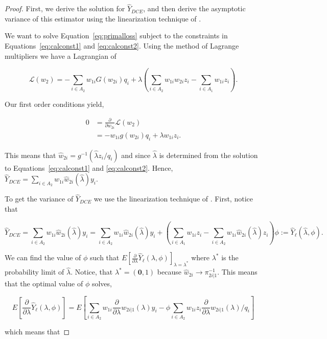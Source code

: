 \documentclass[12pt]{article}
\renewcommand{\bf}[1]{\mathbf{#1}}
\begin{document}
\begin{proof}
  First, we derive the solution for $\hat Y_{DCE}$, and then derive the
  asymptotic variance of this estimator using the linearization technique of
  \cite{randles1982asymptotic}.

  We want to solve Equation~\ref{eq:primalloss} subject to the constraints in
  Equations~\ref{eq:calconst1} and \ref{eq:calconst2}. Using the method of
  Lagrange multipliers we have a Lagrangian of 

  $$\mathcal{L}(w_2) = -\sum_{i \in A_2} w_{1i} G(w_{2i})q_i + \lambda 
  \left(\sum_{i \in A_2} w_{1i} w_{2i} z_i - \sum_{i \in A_1} w_{1i} z_i\right).$$

  Our first order conditions yield,

  \begin{align*}
    0 &= \frac{\partial}{\partial w_{2i}} \mathcal{L}(w_{2}) \\ 
      &= -w_{1i} g(w_{2i}) q_i + \lambda w_{1i} z_i.
  \end{align*}

  This means that $\hat w_{2i} = g^{-1}(\hat \lambda z_i / q_i)$ and since $\hat
  \lambda$ is determined from the solution to Equations~\ref{eq:calconst1} and
  \ref{eq:calconst2}. Hence, $\hat Y_{DCE} = \sum_{i \in A_2} w_{1i} 
  \hat w_{2i}(\hat \lambda) y_i$.

  To get the variance of $\hat Y_{DCE}$ we use the linearization technique of
  \cite{randles1982asymptotic}. First, notice that 

  $$\hat Y_{DCE} = \sum_{i \in A_2} w_{1i} \hat w_{2i}(\hat \lambda) y_i =
  \sum_{i \in A_2} w_{1i} \hat w_{2i}(\hat \lambda) y_i + \left(
  \sum_{i \in A_1} w_{1i} z_i -
  \sum_{i \in A_2} w_{1i} \hat w_{2i}(\hat \lambda) z_i\right)\phi
  := \hat Y_\ell(\hat \lambda, \phi).$$

  We can find the value of $\phi$ such that $E[\frac{\partial}{\partial
  \lambda}\hat Y_\ell(\lambda, \phi)]_{\lambda = \lambda^*}$ where $\lambda^*$
  is the probability limit of $\hat \lambda$. Notice, that 
  $\lambda^* = (\bf 0, 1)$ because $\hat w_{2i} \to \pi_{2i|1}^{-1}$. This means
  that the optimal value of $\phi$ solves,

  $$E\left[\frac{\partial}{\partial \lambda} \hat Y_\ell(\lambda, \phi)\right] =
  E\left[\sum_{i \in A_2} w_{1i} \frac{\partial}{\partial \lambda} w_{2i|1}(\lambda)
    y_i - \phi \sum_{i \in A_2} w_{1i} z_i \frac{\partial}{\partial \lambda}
    w_{2i|1}(\lambda) / q_i \right]$$

  which means that


\end{proof}
\end{document}

